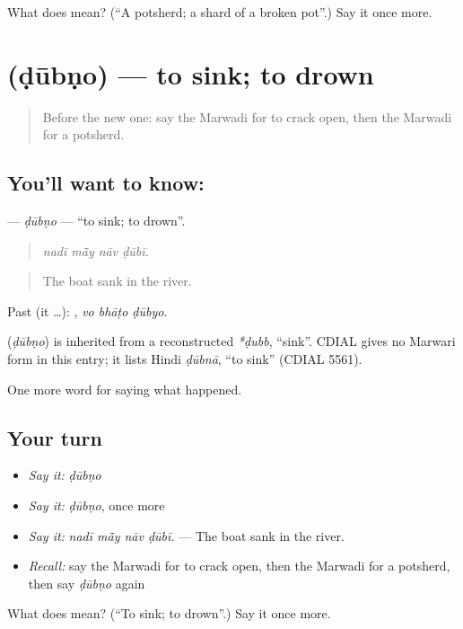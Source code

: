 \begin{tcolorbox}[breakable,colback=teal!4,colframe=teal!35!black,title={Before you move on}]
What does  mean? (\textquotedblleft{}A potsherd; a shard of a broken pot\textquotedblright{}.) Say it once more.
\end{tcolorbox}
\section[\texorpdfstring{\mw{डूबणो} (ḍūbṇo)}{डूबणो (ḍūbṇo)}]{ (ḍūbṇo) — to sink; to drown}

\label{lesson:MW-C242-dubno}



\begin{quote}
Before the new one: say the Marwadi for to crack open, then the Marwadi for a potsherd.
\end{quote}

\subsection*{You'll want to know: }
\textbf{} — \emph{ḍūbṇo} — \textquotedblleft{}to sink; to drown\textquotedblright{}.

\begin{quote}
   
\end{quote}

\begin{quote}
\emph{nadī mā̃y nāv ḍūbī.}
\end{quote}

\begin{quote}
The boat sank in the river.
\end{quote}

Past (it …):   , \emph{vo bhāṭo ḍūbyo}.

\begin{cousinweb}
\textbf{} (\emph{ḍūbṇo}) is inherited from a reconstructed \emph{*ḍubb}, \textquotedblleft{}sink\textquotedblright{}. CDIAL gives no Marwari form in this entry; it lists Hindi \emph{ḍūbnā}, \textquotedblleft{}to sink\textquotedblright{} (CDIAL 5561).
\end{cousinweb}

\begin{grammarlens}[title={What you've built}]
One more word for saying what happened.
\end{grammarlens}

\subsection*{Your turn}
\begin{itemize}
\raggedright
  \item \emph{Say it:} \emph{ḍūbṇo}
  \item \emph{Say it:} \emph{ḍūbṇo}, once more
  \item \emph{Say it:} \emph{nadī mā̃y nāv ḍūbī.} — The boat sank in the river.
  \item \emph{Recall:} say the Marwadi for to crack open, then the Marwadi for a potsherd, then say \emph{ḍūbṇo} again
\end{itemize}

\begin{tcolorbox}[breakable,colback=teal!4,colframe=teal!35!black,title={Before you move on}]
What does  mean? (\textquotedblleft{}To sink; to drown\textquotedblright{}.) Say it once more.
\end{tcolorbox}
